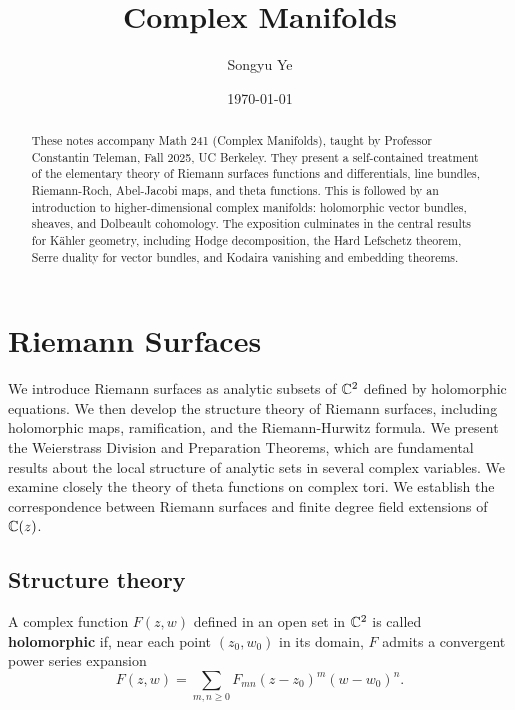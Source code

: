 \documentclass[12pt]{article}
\begin{document}
\rhead{\today}
\cfoot{\thepage}

\title{Complex Manifolds}

\author{Songyu Ye}
\date{\today}
\maketitle


\begin{abstract}
    These notes accompany Math 241 (Complex Manifolds), taught by Professor Constantin Teleman, Fall 2025, UC Berkeley.  They present a self-contained treatment of the elementary theory of Riemann surfaces functions and differentials, line bundles, Riemann-Roch, Abel-Jacobi maps, and theta functions. This is followed by an introduction to higher-dimensional complex manifolds: holomorphic vector bundles, sheaves, and Dolbeault cohomology.  The exposition culminates in the central results for Kähler geometry, including Hodge decomposition, the Hard Lefschetz theorem, Serre duality for vector bundles, and Kodaira vanishing and embedding theorems.
\end{abstract}

\tableofcontents
\section{Riemann Surfaces}
We introduce Riemann surfaces as analytic subsets of $\mathbb{C}^2$ defined by holomorphic equations. We then develop the structure theory of Riemann surfaces, including holomorphic maps, ramification, and the Riemann-Hurwitz formula. We present the Weierstrass Division and Preparation Theorems, which are fundamental results about the local structure of analytic sets in several complex variables. We examine closely the theory of theta functions on complex tori. We establish the correspondence between Riemann surfaces and finite degree field extensions of $\mathbb{C}(z)$.
\subsection{Structure theory}
\begin{definition}
A complex function $F(z,w)$ defined in an open set in $\mathbb{C}^2$ is called
\textbf{holomorphic} if, near each point $(z_0,w_0)$ in its domain, $F$
admits a convergent power series expansion
\[
  F(z,w) = \sum_{m,n\ge 0} F_{mn} (z - z_0)^m (w - w_0)^n .
\]
\end{definition}
\end{document}
